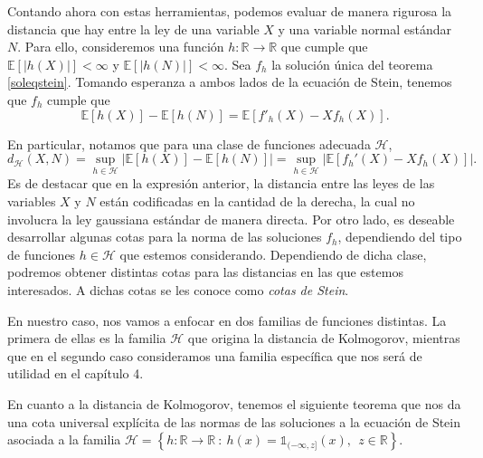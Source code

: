 \documentclass[letterpaper,twoside,12pt]{book}
\newcommand{\R}{\mathbb{R}}
\newcommand{\E}{\mathbb{E}}
\newcommand{\1}{\mathds{1}}
\newcommand{\abs}[1]{\left\lvert #1 \right\rvert}
\renewcommand{\to}{\rightarrow}
\theoremstyle{definition}
\theoremstyle{definition}
\theoremstyle{remark}
\theoremstyle{definition}
\theoremstyle{definition}
\theoremstyle{definition}
\theoremstyle{definition}
\theoremstyle{definition}
\begin{document}
 Contando ahora con estas herramientas, podemos evaluar de manera rigurosa la distancia que hay entre la ley de una variable $X$ y una variable normal estándar $N$. Para ello, consideremos una función $h:\R\to\R$ que cumple que $\E\left[\abs{h(X)}\right]<\infty$ y $\E\left[\abs{h(N)}\right]<\infty$. Sea $f_h$ la solución única del teorema \ref{soleqstein}. Tomando esperanza a ambos lados de la ecuación de Stein, tenemos que $f_h$ cumple que 
\begin{equation}\label{eqmetodostein}
   \E\left[h(X)\right]-\E\left[h(N)\right]=\E\left[f'_h(X)-Xf_h(X)\right].
 \end{equation}
 
 En particular, notamos que para una clase de funciones adecuada $\mathscr{H}$, 
  \begin{equation*}
   d_\mathscr{H}(X,N)=\sup_{h\in \mathscr{H}}\abs{\E\left[h(X)\right]-\E\left[h(N)\right]}=\sup_{h\in \mathscr{H}}\abs{\E\left[f_h'(X)-Xf_h(X)\right]}.
   \end{equation*}
 Es de destacar que en la expresión anterior, la distancia entre las leyes de las variables $X$ y $N$ están codificadas en la cantidad de la derecha, la cual no involucra la ley gaussiana estándar de manera directa. Por otro lado, es deseable desarrollar algunas cotas para la norma de las soluciones $f_h$, dependiendo del tipo de funciones $h\in\mathscr{H}$ que estemos considerando. Dependiendo de dicha clase, podremos obtener distintas cotas para las distancias en las que estemos interesados. A dichas cotas se les conoce como \textit{cotas de Stein}.
 
 En nuestro caso, nos vamos a enfocar en dos familias de funciones distintas. La primera de ellas es la familia $\mathscr{H}$ que origina la distancia de Kolmogorov, mientras que en el segundo caso consideramos una familia específica que nos será de utilidad en el capítulo 4.
 
En cuanto a la distancia de Kolmogorov, tenemos el siguiente teorema que nos da una cota universal explícita de las normas de las soluciones a la ecuación de Stein asociada a la familia $\mathscr{H}= \left\{h:\R\to \R \ :\ h(x)=\1_{(-\infty,z]}(x),\ \  z\in \R\right\}$.
  
\end{document}
